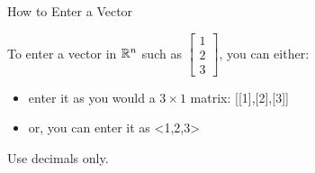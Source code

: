 \begin{edXshowhide}{How to Enter a Vector}

To enter a vector in $\mathbb R^n$ such as $\left[\begin{array}{c} 1 \\ 2  \\ 3 \end{array} \right]$, you can either:
\begin{itemize}
\item
enter it as 
you would a $3\times 1$ matrix: [[1],[2],[3]]  
\item
or, you can enter it as <1,2,3>
\end{itemize}

Use decimals only.  

\end{edXshowhide}


